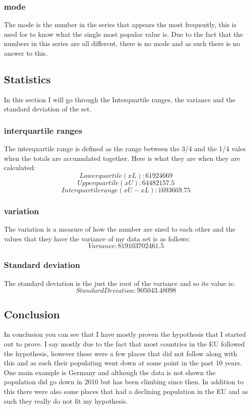 \documentclass{article}
\begin{document}
\subsubsection{mode}
The mode is the number in the series that appears the most frequently, this is used for to know what the single most popular value is. Due to the fact that the numbers in this series are all different, there is no mode and as such there is no answer to this.  
\subsection{Statistics}
In this section I will go through the Interquartile ranges, the variance and the standard deviation of the set. 
\subsubsection{interquartile ranges}
The interquartile range is defined as the range between the 3/4 and the 1/4 vales when the totals are accumulated together. Here is what they are when they are calculated:
\[
Lower quartile (xL): 61924669
\]
\[
Upper quartile (xU): 64482157.5
\]
\[
	Interquartile range (xU-xL): 1693669.75  
\]
\subsubsection{variation}
The variation is a measure of how the number are sized to each other and the values that they have the variance of my data set is as follows:
\[
	Variance: 819103702461.5
\]
\subsubsection{Standard deviation}
The standard deviation is the just the root of the variance and so its value is:
\[
	Standard Deviation: 905043.48098
\]
\subsection{Conclusion}
In conclusion you can see that I have mostly proven the hypothesis that I started out to prove. I say mostly due to the fact that most countries in the EU followed the hypothesis, however these were a few places that did not follow along with this and as such their populating went down at some point in the past 10 years. One main example is Germany and although the data is not shown the population did go down in 2010 but has been climbing since then. In addition to this there were also some places that had a declining population in the EU and as such they really do not fit my hypothesis.   
\end{document}
